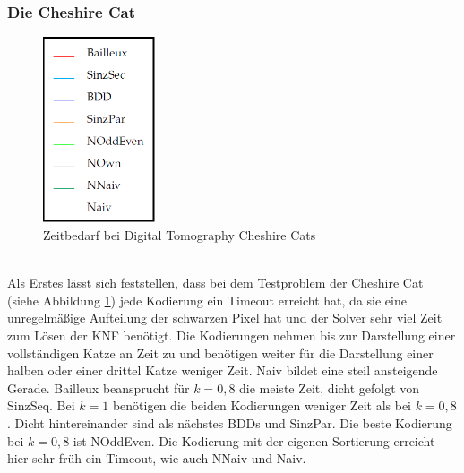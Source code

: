 \documentclass[a4,abstract=on]{scrartcl}
\begin{document}
\subsubsection*{Die Cheshire Cat}


\begin{figure}[htbp!]
\includegraphics[width=3.3cm]{legende.png}
\caption{Zeitbedarf bei Digital Tomography Cheshire Cats}
\label{fig:cheshire}
\end{figure}
\ \\
Als Erstes lässt sich feststellen, dass bei dem Testproblem der Cheshire Cat (siehe Abbildung \ref{fig:cheshire}) jede Kodierung ein Timeout erreicht hat, da sie eine unregelmäßige Aufteilung der schwarzen Pixel hat und der Solver sehr viel Zeit zum Lösen der KNF benötigt. Die Kodierungen nehmen bis zur Darstellung einer vollständigen Katze an Zeit zu und benötigen weiter für die Darstellung einer halben oder einer drittel Katze weniger Zeit. Naiv bildet eine steil ansteigende Gerade. Bailleux beansprucht für $k=0,8$ die meiste Zeit, dicht gefolgt von SinzSeq. Bei $k=1$ benötigen die beiden Kodierungen weniger Zeit als bei $k=0,8$. Dicht hintereinander sind als nächstes BDDs und SinzPar. Die beste Kodierung bei $k=0,8$ ist NOddEven. Die Kodierung mit der eigenen Sortierung erreicht hier sehr früh ein Timeout, wie auch NNaiv und Naiv. 
\end{document}
